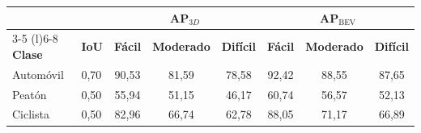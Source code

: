 \begin{tabular}{@{}llcccccc@{}}
\toprule
 & & \multicolumn{3}{c}{\textbf{AP$_{3D}$}} & \multicolumn{3}{c}{\textbf{AP$_{\text{BEV}}$}} \\
\cmidrule(lr){3-5} \cmidrule(l){6-8}
\textbf{Clase} & \textbf{IoU} & \textbf{Fácil} & \textbf{Moderado} & \textbf{Difícil} & \textbf{Fácil} & \textbf{Moderado} & \textbf{Difícil} \\
\midrule
Automóvil & 0,70 & 90,53 & 81,59 & 78,58 & 92,42 & 88,55 & 87,65 \\
Peatón & 0,50 & 55,94 & 51,15 & 46,17 & 60,74 & 56,57 & 52,13 \\
Ciclista & 0,50 & 82,96 & 66,74 & 62,78 & 88,05 & 71,17 & 66,89 \\
\bottomrule
\end{tabular}
